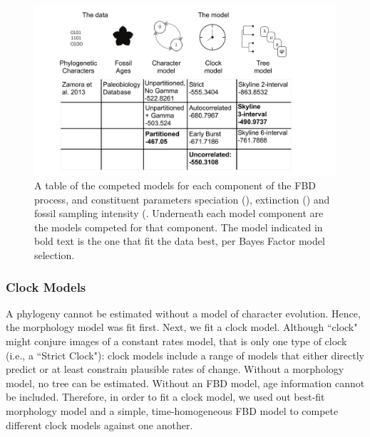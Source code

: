 \documentclass{article}
\begin{document}
\begin{figure}
  \includegraphics[width=\textwidth]{figures/Fig2.pdf}

  \caption{A table of the competed models for each component of the FBD process, and constituent parameters speciation (\textit{\textlambda}), extinction (\textit{\textmu}) and fossil sampling intensity (\textit{\textpsi}. Underneath each model component are the models competed for that component. The model indicated in bold text is the one that fit the data best, per Bayes Factor model selection.}
\end{figure}


\subsubsection{Clock Models}

A phylogeny cannot be estimated without a model of character evolution. %
Hence, the morphology model was fit first.
Next, we fit a clock model.
Although ``clock" might conjure images of a constant rates model, that is only one type of clock (i.e., a ``Strict Clock"): clock models include a range of models that either directly predict or at least constrain plausible rates of change. %
Without a morphology model, no tree can be estimated.
Without an FBD model, age information cannot be included.
Therefore, in order to fit a clock model, we used out best-fit morphology model and a simple, time-homogeneous FBD model to compete different clock models against one another.
\end{document}
